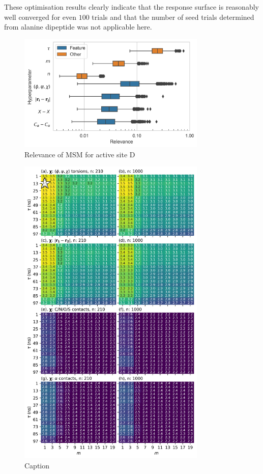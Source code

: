 These optimisation results clearly indicate that the response surface is reasonably well converged for even $100$ trials and that the number of seed trials determined from alanine dipeptide was not applicable here.  




\begin{figure}[ht]
    \centering
    \caption{Relevance of MSM for active site D}
    \includegraphics[width=0.8\textwidth]{chapters/msm_optimization/figures/AADH_relevance_d.png}
    
    \label{fig:aadh_relevance}
\end{figure}

\begin{figure}[ht]
    \centering
    \includegraphics[width=0.8\textwidth]{chapters/msm_optimization/figures/aadh_response_surface_d.png}
    \caption{Caption}
    \label{fig:aadh_rsm}
\end{figure}

